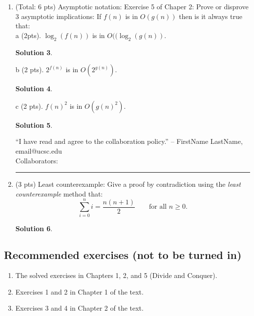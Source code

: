 \documentclass[11pt]{article}
\newtheorem*{solution}{Solution}
\begin{document}
\begin{enumerate}
b (3 pts). Identify and clearly describe the flaw in the proof of claim~\ref{c:height}.
\begin{solution}
\end{solution}
\newpage
c (4 pts). Now go back to the proof of the first claim.  \\
Does it have a flaw or hidden assumption? (1 pt) \\
Either clearly describe the flaw/assumption, or argue that the proof is correct (3 pts).
\begin{solution}
\end{solution}
\newpage
“I have read and agree to the collaboration policy.” -- FirstName LastName, email@ucsc.edu
\\
Collaborators: %
\\
\hrule
\item (Total: 6 pts) Asymptotic notation:  Exercise 5 of Chaper 2: Prove or disprove 3 asymptotic implications: If $f(n)$ is in $O(g(n))$ then is it always true that: \\
a (2pts). $\log_2 (f(n))$ is in $O(( \log_2 (g(n))$.  
\begin{solution}
\end{solution}
\newpage
b (2 pts). $2^{f(n)}$ is in $O( 2^{g(n)} )$. 
\begin{solution}
\end{solution}
\newpage
c (2 pts). $f(n)^2$ is in $O(g(n)^2)$.
\begin{solution}
\end{solution}
\newpage
“I have read and agree to the collaboration policy.” -- FirstName LastName, email@ucsc.edu
\\
Collaborators: %
\\
\hrule
\item (3 pts) Least counterexample: Give a proof by contradiction using the \emph{least counterexample} method that:
\[
\sum_{i=0}^n i = \frac{n (n+1)}{2}  \qquad \text{for all $n \geq 0$}.
\]
\begin{solution}
\end{solution}
\newpage
\end{enumerate}

\subsection*{Recommended exercises (not to be turned in)}
\begin{enumerate}
\item The solved exercises in Chapters 1, 2, and 5 (Divide and Conquer).
\item Exercises 1 and 2 in Chapter 1 of the text.
\item Exercises 3 and 4 in Chapter 2 of the text.
\end{enumerate} 
\end{document}
